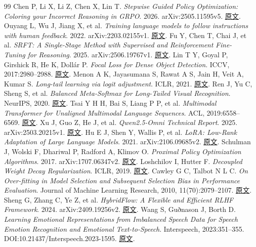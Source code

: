 \documentclass[UTF8,a4paper,11pt,fontset=windows]{ctexart}
\begin{document}
\begin{thebibliography}{99}
 Chen P, Li X, Li Z, Chen X, Lin T. \emph{Stepwise Guided Policy Optimization: Coloring your Incorrect Reasoning in GRPO}. 2026. arXiv:2505.11595v5. \href{https://arxiv.org/abs/2505.11595v5}{原文}.
 Ouyang L, Wu J, Jiang X, et al. \emph{Training language models to follow instructions with human feedback}. 2022. arXiv:2203.02155v1. \href{https://arxiv.org/abs/2203.02155v1}{原文}.
 Fu Y, Chen T, Chai J, et al. \emph{SRFT: A Single-Stage Method with Supervised and Reinforcement Fine-Tuning for Reasoning}. 2025. arXiv:2506.19767v1. \href{https://arxiv.org/abs/2506.19767v1}{原文}.
 Lin T Y, Goyal P, Girshick R, He K, Dollár P. \emph{Focal Loss for Dense Object Detection}. ICCV, 2017:2980–2988. \href{https://openaccess.thecvf.com/content_iccv_2017/html/Lin_Focal_Loss_for_ICCV_2017_paper.html}{原文}.
 Menon A K, Jayasumana S, Rawat A S, Jain H, Veit A, Kumar S. \emph{Long-tail learning via logit adjustment}. ICLR, 2021. \href{https://arxiv.org/abs/2007.07314v2}{原文}.
 Ren J, Yu C, Sheng S, et al. \emph{Balanced Meta-Softmax for Long-Tailed Visual Recognition}. NeurIPS, 2020. \href{https://papers.neurips.cc/paper_files/paper/2020/hash/2ba61cc3a8f44143e1f2f13b2b729ab3-Abstract.html}{原文}.
 Tsai Y H H, Bai S, Liang P P, et al. \emph{Multimodal Transformer for Unaligned Multimodal Language Sequences}. ACL, 2019:6558–6569. \href{https://aclanthology.org/P19-1656/}{原文}.
 Xu J, Guo Z, He J, et al. \emph{Qwen2.5-Omni Technical Report}. 2025. arXiv:2503.20215v1. \href{https://arxiv.org/abs/2503.20215v1}{原文}.
 Hu E J, Shen Y, Wallis P, et al. \emph{LoRA: Low-Rank Adaptation of Large Language Models}. 2021. arXiv:2106.09685v2. \href{https://arxiv.org/abs/2106.09685v2}{原文}.
 Schulman J, Wolski F, Dhariwal P, Radford A, Klimov O. \emph{Proximal Policy Optimization Algorithms}. 2017. arXiv:1707.06347v2. \href{https://arxiv.org/abs/1707.06347v2}{原文}.
 Loshchilov I, Hutter F. \emph{Decoupled Weight Decay Regularization}. ICLR, 2019. \href{https://arxiv.org/abs/1711.05101v3}{原文}.
 Cawley G C, Talbot N L C. \emph{On Over-fitting in Model Selection and Subsequent Selection Bias in Performance Evaluation}. Journal of Machine Learning Research, 2010, 11(70):2079–2107. \href{https://jmlr.org/papers/v11/cawley10a.html}{原文}.
 Sheng G, Zhang C, Ye Z, et al. \emph{HybridFlow: A Flexible and Efficient RLHF Framework}. 2024. arXiv:2409.19256v2. \href{https://arxiv.org/abs/2409.19256v2}{原文}.
 Wang S, Guðnason J, Borth D. \emph{Learning Emotional Representations from Imbalanced Speech Data for Speech Emotion Recognition and Emotional Text-to-Speech}. Interspeech, 2023:351–355. DOI:10.21437/Interspeech.2023-1595. \href{https://www.isca-archive.org/interspeech_2023/wang23ka_interspeech.html}{原文}.
\end{thebibliography}
\clearpage
\appendix
\end{document}
